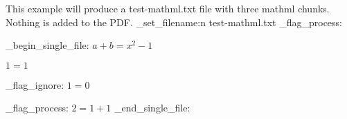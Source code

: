 \documentclass{article}
\begin{document}
This example will produce a test-mathml.txt file with three mathml chunks.
Nothing is added to the PDF.
\ExplSyntaxOn
\luamml_set_filename:n {test-mathml.txt}
\luamml_flag_process: 

\luamml_begin_single_file:
\ExplSyntaxOff
$a+b=x^2 -1 $

$1=1$

\ExplSyntaxOn
\luamml_flag_ignore: 
$1=0$

\luamml_flag_process: 
$ 2=1+1 $
\luamml_end_single_file:
\ExplSyntaxOff
\end{document}
